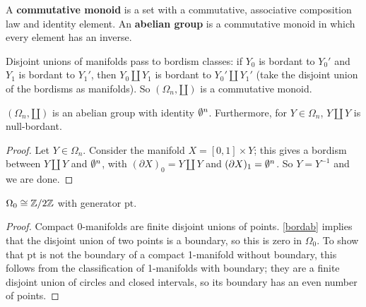 \begin{definition}[]
    A \textbf{commutative monoid} is a set with a commutative, associative composition law and identity element. An \textbf{abelian group} is a commutative monoid in which every element has an inverse.
\end{definition}
Disjoint unions of manifolds pass to bordism classes: if $Y_0$ is bordant to $Y_0'$ and $Y_1$ is bordant to $Y_1'$, then $Y_0\amalg Y_1$ is bordant to $Y_0'\amalg Y_1'$ (take the disjoint union of the bordisms as manifolds). So $(\Omega_n ,\amalg)$ is a commutative monoid.
\begin{lemma}\label{bordab} 
    $(\Omega_n,\amalg )$ is an abelian group with identity $\emptyset^n $. Furthermore, for $Y \in \Omega_n $, $Y\amalg Y$ is null-bordant.
\end{lemma}
\begin{proof}
    Let $Y \in  \Omega_n $. Consider the manifold $X=[0,1] \times Y$; this gives a bordism between $Y\amalg Y$ and $\emptyset^n $, with $(\partial X)_0=Y\amalg Y $ and $(\partial X)_1=\emptyset^n $. 
    So $Y=Y^{-1}$ and we are done.
\end{proof}
\begin{prop}
    $\Omega_0 \cong \mathbb{Z} /2\mathbb{Z}$ with generator $\mathrm{pt} $.
\end{prop}
\begin{proof}
    Compact 0-manifolds are finite disjoint unions of points. \cref{bordab} implies that the disjoint union of two points is a boundary, so this is zero in $\Omega_0$. To show that $\mathrm{pt}$ is not the boundary of a compact 1-manifold without boundary, this follows from the classification of 1-manifolds with boundary; they are a finite disjoint union of circles and closed intervals, so its boundary has an even number of points.
\end{proof}

